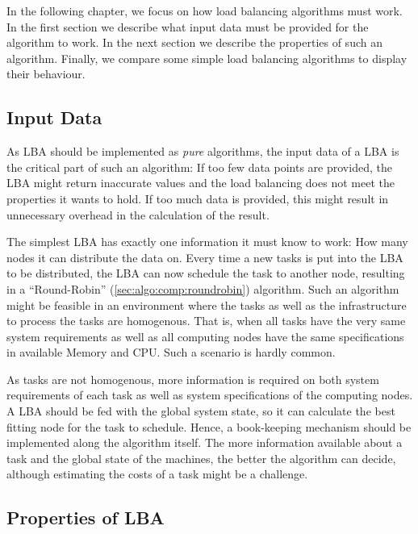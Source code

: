 In the following chapter, we focus on how load balancing algorithms must work.
In the first section we describe what input data must be provided for the
algorithm to work.
In the next section we describe the properties of such an algorithm.
Finally, we compare some simple load balancing algorithms to display their
behaviour.

\subsection{Input Data}
\label{sec:algo:input}

As \ac{LBA} should be implemented as \emph{pure} algorithms,
the input data of a \ac{LBA} is the
critical part of such an algorithm: If too few data points are
provided, the \ac{LBA} might return inaccurate values and the load balancing
does not meet the properties it wants to hold.
If too much data is provided, this might result in unnecessary overhead in the
calculation of the result.

The simplest \ac{LBA} has exactly one information it must know to work: How many
nodes it can distribute the data on.
Every time a new tasks is put into the \ac{LBA} to be distributed, the \ac{LBA}
can now schedule the task to another node, resulting in a ``Round-Robin''
(\ref{sec:algo:comp:roundrobin}) algorithm.
Such an algorithm might be feasible in an environment where the tasks as well as
the infrastructure to process the tasks are homogenous.
That is, when all tasks have the very same system requirements as well as all
computing nodes have the same specifications in available Memory and CPU.
Such a scenario is hardly common.

As tasks are not homogenous, more information is required on both system
requirements of each task as well as system specifications of the computing
nodes.
A \ac{LBA} should be fed with the global system state, so it can calculate the
best fitting node for the task to schedule.
Hence, a book-keeping mechanism should be implemented along the algorithm
itself.
The more information available about a task and the global state of the
machines, the better the algorithm can decide, although estimating the costs of
a task might be a challenge.


\subsection{Properties of \ac{LBA}}
\label{sec:algo:prop}

